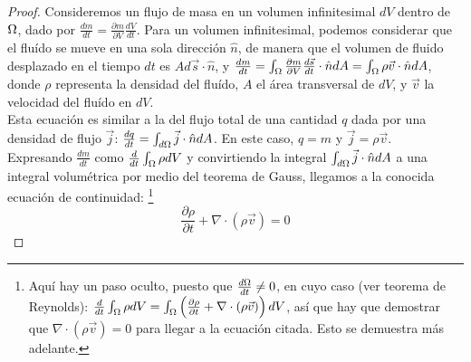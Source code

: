\begin{proof} 
Consideremos un flujo de masa en un volumen infinitesimal $dV$ dentro de $\Omega$, dado por $\frac{dm}{dt} = \frac{\partial m}{\partial V} \frac{dV}{dt}$.
Para un volumen infinitesimal, podemos considerar que el fluído se mueve en una sola dirección $\hat{n}$, de manera que el volumen de fluido desplazado en el tiempo $dt$ es $A d\vec{s} \cdot \hat{n}$, y $\frac{dm}{dt} = \int_{\Omega} \frac{\partial m}{\partial V} \frac{d\vec{s}}{dt} \cdot \hat{n} {dA} = \int_{\Omega} \rho \vec{v} \cdot \hat{n} dA $, donde $\rho$ representa la densidad del fluído, $A$ el área transversal de $dV$, y $\vec{v}$ la velocidad del fluído en $dV$.\\
Esta ecuación es similar a la del flujo total de una cantidad $q$ dada por una densidad de flujo $\vec{j}$: $\frac{dq}{dt} = \int_{d\Omega} \vec{j} \cdot \hat{n} dA$. En este caso, $q = m$ y $\vec{j} = \rho \vec{v}$. \\
Expresando $\frac{dm}{dt}$ como $\frac{d}{dt} \int_\Omega \rho dV$ y convirtiendo la integral $\int_{d\Omega} \vec{j} \cdot \hat{n} dA$ a una integral volumétrica por medio del teorema de Gauss, llegamos a la conocida ecuación de continuidad: \footnote{Aquí hay un paso oculto, puesto que $\frac{d\Omega}{dt} \neq 0$, en cuyo caso (ver teorema de Reynolds):  $\frac{d}{dt} \int_\Omega \rho dV =\int_\Omega \left( \frac{\partial \rho}{\partial t} + \nabla \cdot (\rho \vec{v}) \right) dV$, así que hay que demostrar que $\nabla \cdot (\rho \vec{v}) = 0$ para llegar a la ecuación citada. Esto se demuestra más adelante. }
\[
  \frac{ \partial \rho}{\partial t} + \nabla \cdot (\rho \vec{v}) = 0
\]
\end{proof}


